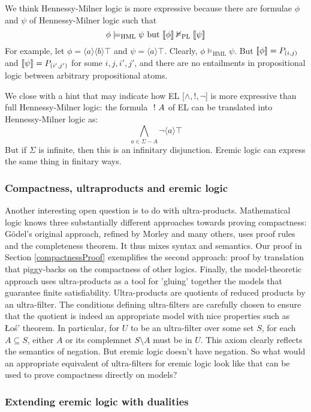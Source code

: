 \NI We think Hennessy-Milner logic is more expressive because there
are formulae $\phi$ and $\psi$ of Hennessy-Milner logic such that
\[
\phi \models_{\text{{HML}}} \psi \mbox{ but } \lbrack\!\lbrack \phi \rbrack\!\rbrack \nvDash_{\text{PL}} \lbrack\!\lbrack \psi \rbrack\!\rbrack
\]
For example, let $\phi = \langle a \rangle \langle b \rangle \top$ and
$\psi = \langle a \rangle \top$.  Clearly, $\phi \models_{\text{HML}}
\psi$. But $\lbrack\!\lbrack \phi \rbrack\!\rbrack = P_{(i,j)}$ and $\lbrack\!\lbrack \psi \rbrack\!\rbrack = P_{(i',j')}$
for some $i,j,i',j'$, and there are no entailments in propositional
logic between arbitrary propositional atoms.

We close with a hint that may indicate how EL [$\land, !, \neg$] is
more expressive than full Hennessy-Milner logic: the formula $\ ! \ 
A$ of EL can be translated into Hennessy-Milner logic as:
\[
\bigwedge_{a \in \Sigma - A} \neg \langle a \rangle \top
\]
But if $\Sigma$ is infinite, then this is an infinitary disjunction.
Eremic logic can express the same thing in finitary ways.

\subsubsection{Compactness, ultraproducts and eremic logic}

Another interesting open question is to do with
ultra-products. Mathematical logic knows three substantially different
approaches towards proving compactness: G\"odel's original approach,
refined by Morley and many others, uses proof rules and the
completeness theorem. It thus mixes syntax and semantics. Our proof in
Section \ref{compactnessProof} exemplifies the second approach: proof
by translation that piggy-backs on the compactness of other
logics. Finally, the model-theoretic approach uses ultra-products as a
tool for 'gluing' together the models that guarantee finite
satisfiability. Ultra-products are quotients of reduced products by an
ultra-filter. The conditions defining ultra-filters are carefully
chosen to ensure that the quotient is indeed an appropriate model with
nice properties such as \L{}o\'{s}' theorem. In particular, for $U$ to
be an ultra-filter over some set $S$, for each $A \subseteq S$, either
$A$ or its complemnet $S\setminus A$ must be in $U$. This axiom
clearly reflects the semantics of negation. But eremic logic doesn't
have negation. So what would an appropriate equivalent of
ultra-filters for eremic logic look like that can be used to prove
compactness directly on models?

\subsubsection{Extending eremic logic with dualities}

